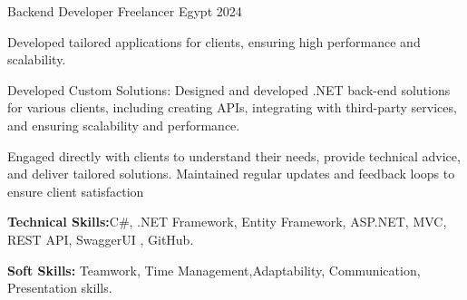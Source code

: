 \begin{cventries}
     \cventry
    {Backend Developer} %
    {Freelancer} %
    {Egypt} %
    {2024} %
    {
      \begin{cvitems} %
        \item {Developed tailored applications for clients, ensuring high performance and scalability.}
        \item {Developed Custom Solutions: Designed and developed .NET back-end solutions for various clients, including creating APIs, integrating with third-party services, and ensuring scalability and performance.}
        \item { Engaged directly with clients to understand their needs, provide technical advice, and deliver tailored solutions. Maintained regular updates and feedback loops to ensure client satisfaction}
        \item {\textbf{Technical Skills:}C\#, .NET Framework, Entity Framework, ASP.NET, MVC, REST API, SwaggerUI , GitHub.}
        \item {\textbf{Soft Skills:} Teamwork, Time Management,Adaptability,  Communication, Presentation skills.}
      \end{cvitems}
    }

\end{cventries}
